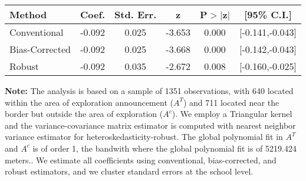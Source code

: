 \begin{table}[htbp]\centering
 \footnotesize 
\begin{tabular}{lccccc}
\hline\hline
Method & Coef. & Std. Err. & z & P$>|$z$|$ & [95\% C.I.] \\ 
\hline \hline  
Conventional & -0.092 & 0.025 & -3.653 & 0.000 & [-0.141,-0.043] \\ 
 Bias-Corrected & -0.092 & 0.025 & -3.668 & 0.000 & [-0.142,-0.043] \\ 
Robust & -0.092 & 0.035 & -2.672 & 0.008 & [-0.160,-0.025] \\ 
  \hline\hline
\end{tabular}
\label{table:rd}
\begin{tablenotes} 
  \justifying \tiny \textbf{Note: }    
   The analysis is based on a sample of 1351 observations, with 640 located within the area of exploration announcement ($A^{T}$) and 711 located near the border but outside the area of exploration  ($A^{c}$). 
           We employ a Triangular kernel and the variance-covariance matrix estimator is computed with nearest neighbor variance estimator for heteroskedasticity-robust. The global polynomial fit in  $A^{T}$ and $A^{c}$ is of order 1, the bandwith where the global polynomial fit is of 5219.424 meters.. We estimate all coefficients using conventional, bias-corrected, and robust estimators, and we cluster standard errors at the school level. \end{tablenotes} 
 \end{table} 
